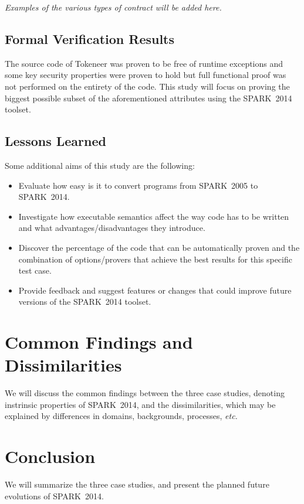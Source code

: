 \documentclass[10pt,a4paper,twocolumn]{article}
\newcommand{\oldspark}{SPARK~2005\xspace}
\newcommand{\newspark}{SPARK~2014\xspace}
\newcommand{\etc}{\textit{etc.}\xspace}
\begin{document}
\emph{Examples of the various types of contract will be added here.}

\subsection{Formal Verification Results}

The source code of Tokeneer was proven to be free of runtime exceptions
and some key security properties were proven to hold but full functional
proof was not performed on the entirety of the code. This study will
focus on proving the biggest possible subset of the aforementioned
attributes using the \newspark toolset.

\subsection{Lessons Learned}

Some additional aims of this study are the following:
\begin {itemize}
  \item Evaluate how easy is it to convert programs from \oldspark to \newspark.
  \item Investigate how executable semantics affect the way code has to be written
        and what advantages/disadvantages they introduce.
  \item Discover the percentage of the code that can be automatically proven
        and the combination of options/provers that achieve the best results
        for this specific test case.
  \item Provide feedback and suggest features or changes that could improve future versions of the \newspark toolset.
\end {itemize}

\section{Common Findings and Dissimilarities}

We will discuss the common findings between the three case studies, denoting
instrinsic properties of \newspark, and the dissimilarities, which may be
explained by differences in domains, backgrounds, processes, \etc

\section{Conclusion}

We will summarize the three case studies, and present the planned future
evolutions of \newspark.



\end{document}
